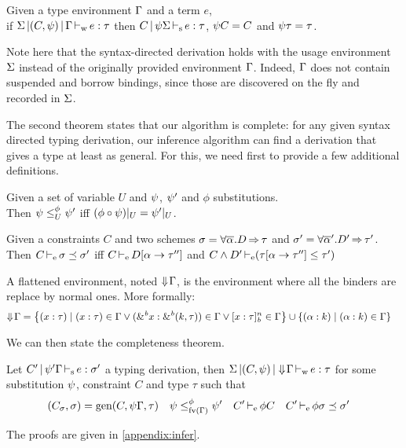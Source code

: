 \begin{theorem}
  Given a type environment $\E$ and a term $e$,\\
  if $\inferW{\Sv}{(C,\unif)}{\E}{e}{\tau}$
  then $\inferS{C}{\unif\Sv}{e}{\tau}$, $\unif C = C$ and $\unif \tau = \tau$.
\end{theorem}

Note here that the syntax-directed derivation holds with the usage environment $\Sv$ instead of the originally provided environment $\E$. Indeed,
$\E$ does not contain suspended and borrow bindings, since those
are discovered on the fly and recorded in $\Sv$.

The second theorem states that our algorithm is complete: for any given
syntax directed typing derivation, our inference algorithm can find
a derivation that gives a type at least as general.
For this, we need first to provide a few additional definitions.

\begin{definition}
  Given a set of variable $U$ and $\unif$, $\unif'$ and $\phi$
  substitutions. \\
  Then
  $\unif \leq^{\phi}_{U} \unif'$ iff $(\phi \circ \unif)|_{U} = \unif'|_U$.
\end{definition}

\begin{definition}
  Given a constraints $C$ and two schemes
  $\schm = \forall \Multi\tvar. \qual{D}{\tau}$ and
  $\schm' = \forall \Multi\tvar'. \qual{D'}{\tau'} $.
  Then $\entail{C}{\schm \preceq \schm'}$
  iff $\entail{C}{\subst{\tvar}{\tau''} D}$
  and $\entail{C\Cand D'}{\Cleq{\subst{\tvar}{\tau''}\tau}{\tau'}}$
\end{definition}

\begin{definition}
A flattened environment,
noted $\Eflat\E$, is the environment
where all the binders are replace by normal ones. More formally:
\begin{align*}
  \Eflat\E
  &= \left\{ \bvar{x}{\tau} \mid
    \bvar{x}{\tau}\in\E
    \vee \bvar{\borrow{x}}{\borrowty{k}{\tau}}\in\E
    \vee \svar{x}{\tau}^n\in\E
    \right\} \cup \left\{ \bvar{\tvar}{k} \mid \bvar{\tvar}{k}\in\E \right\}
\end{align*}
\end{definition}


We can then state the completeness theorem.

\begin{theorem}[Completeness]
  Let $\inferS{C'}{\unif'\E}{e}{\schm'}$ a typing derivation,
  then $\inferW{\Sv}{(C,\unif)}{\Eflat\E}{e}{\tau}$
  for some substitution $\unif$, constraint $C$ and type $\tau$ such
  that
  \begin{align*}
    (C_\schm,\schm) &= \generalize{C}{\unif\E}{\tau}
    &\unif &\leq^{\phi}_{\fv{\E}} \unif'
    &\entail{C'&}{\phi C}
    &\entail{C'&}{\phi \schm \preceq \schm'}
  \end{align*}
\end{theorem}

The proofs are given in \cref{appendix:infer}.

